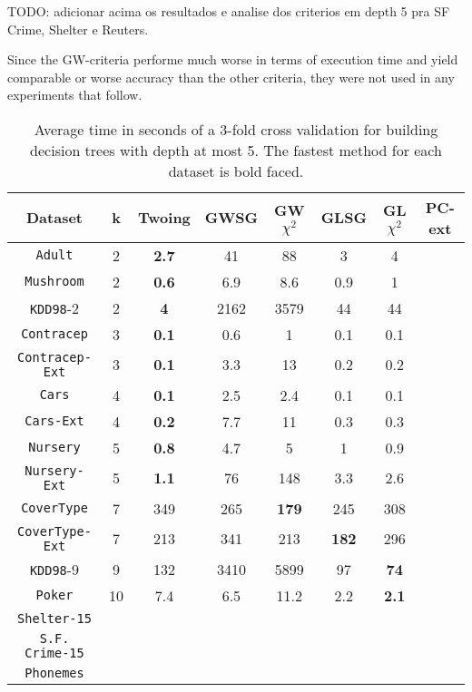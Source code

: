 TODO: adicionar acima os resultados e analise dos criterios em depth 5 pra SF Crime, Shelter e Reuters.

Since the GW-criteria performe much worse in terms of execution time and yield comparable or worse accuracy than the other criteria, they were not used in any experiments that follow.

\begin{table*}[]
\small
\centering
\caption{Average time in seconds of a 3-fold cross validation
for building decision trees with depth at most 5.
The fastest method for each dataset is bold faced.}
\begin{tabular}{c|c|c|c|c|c|c|c}
Dataset & k & Twoing  & GWSG  &         GW$\chi^2$      & GLSG  & GL$\chi^2$ & PC-ext     \\ \hline
{\tt Adult}         & 2 & {\bf  2.7} & 41   & 88   & 3   & 4 &  \\
{\tt Mushroom}      & 2 & {\bf 0.6} & 6.9  & 8.6  & 0.9 & 1  & \\
{\tt KDD98}-2       & 2 & {\bf 4}   & 2162 & 3579 & 44  & 44 & \\
{\tt Contracep}     & 3 & {\bf 0.1} & 0.6  & 1    & 0.1 & 0.1& \\
{\tt Contracep-Ext} & 3 & {\bf 0.1} & 3.3  & 13   & 0.2 & 0.2& \\
{\tt Cars}          & 4 & {\bf 0.1} & 2.5  & 2.4  & 0.1 & 0.1& \\
{\tt Cars-Ext}      & 4 & {\bf 0.2} & 7.7  & 11   & 0.3 & 0.3& \\
{\tt Nursery}       & 5 & {\bf 0.8} & 4.7  & 5    & 1   & 0.9& \\
{\tt Nursery-Ext}   & 5 & {\bf 1.1} & 76  & 148  & 3.3 & 2.6 &  \\
{\tt CoverType}     & 7 & 349 & 265  & {\bf 179}  & 245 & 308& \\
{\tt CoverType-Ext} & 7 & 213 & 341  & 213  & {\bf 182} & 296& \\
{\tt KDD98}-9       & 9 & 132 & 3410 & 5899 & 97  & {\bf 74} & \\ 
{\tt Poker}         & 10 & 7.4 & 6.5 & 11.2 & 2.2  & {\bf 2.1}&\\
{\tt Shelter-15}    &    &     &     &      &     & &        \\   
{\tt S.F. Crime-15} &  &  & &  & & &       \\ 
{\tt Phonemes}      &  &  & &  & & &       
\end{tabular}
\label{tab:time}
\end{table*}



